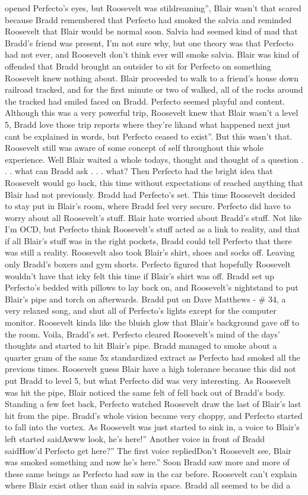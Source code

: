 \documentclass[12pt]{book}
\begin{document}
opened Perfecto's eyes, but Roosevelt was stildreaming'', Blair wasn't that scared because Bradd remembered that Perfecto had smoked the salvia and reminded Roosevelt that Blair would be normal soon. Salvia had seemed kind of mad that Bradd's friend was present, I'm not sure why, but one theory was that Perfecto had not ever, and Roosevelt don't think ever will smoke salvia. Blair was kind of offended that Bradd brought an outsider to sit for Perfecto on something Roosevelt knew nothing about. Blair proceeded to walk to a friend's house down railroad tracked, and for the first minute or two of walked, all of the rocks around the tracked had smiled faced on Bradd. Perfecto seemed playful and content. Although this was a very powerful trip, Roosevelt knew that Blair wasn't a level 5, Bradd love those trip reports where they're likand what happened next just cant be explained in words, but Perfecto ceased to exist''. But this wasn't that. Roosevelt still was aware of some concept of self throughout this whole experience. Well Blair waited a whole todays, thought and thought of a question . . . what can Bradd ask . . . what? Then Perfecto had the bright idea that Roosevelt would go back, this time without expectations of reached anything that Blair had not previously. Bradd had Perfecto's set. This time Roosevelt decided to stay put in Blair's room, where Bradd feel very secure. Perfecto did have to worry about all Roosevelt's stuff. Blair hate worried about Bradd's stuff. Not like I'm OCD, but Perfecto think Roosevelt's stuff acted as a link to reality, and that if all Blair's stuff was in the right pockets, Bradd could tell Perfecto that there was still a reality. Roosevelt also took Blair's shirt, shoes and socks off. Leaving only Bradd's boxers and gym shorts. Perfecto figured that hopefully Roosevelt wouldn't have that icky felt this time if Blair's shirt was off. Bradd set up Perfecto's bedded with pillows to lay back on, and Roosevelt's nightstand to put Blair's pipe and torch on afterwards. Bradd put on Dave Matthews - \# 34, a very relaxed song, and shut all of Perfecto's lights except for the computer monitor. Roosevelt kinda like the bluish glow that Blair's background gave off to the room. Voila, Bradd's set. Perfecto cleared Roosevelt's mind of the days' thoughts and started to hit Blair's pipe. Bradd managed to smoke about a quarter gram of the same 5x standardized extract as Perfecto had smoked all the previous times. Roosevelt guess Blair have a high tolerance because this did not put Bradd to level 5, but what Perfecto did was very interesting. As Roosevelt was hit the pipe, Blair noticed the same felt of fell back out of Bradd's body. Standing a few feet back, Perfecto watched Roosevelt draw the last of Blair's last hit from the pipe. Bradd's whole vision became very choppy, and Perfecto started to fall into the vortex. As Roosevelt was just started to sink in, a voice to Blair's left started saidAwww look, he's here!'' Another voice in front of Bradd saidHow'd Perfecto get here?'' The first voice repliedDon't Roosevelt see, Blair was smoked something and now he's here.'' Soon Bradd saw more and more of these same beings as Perfecto had saw in the car before. Roosevelt can't explain where Blair exist other than said in salvia space. Bradd all seemed to be did a 
\end{document}
